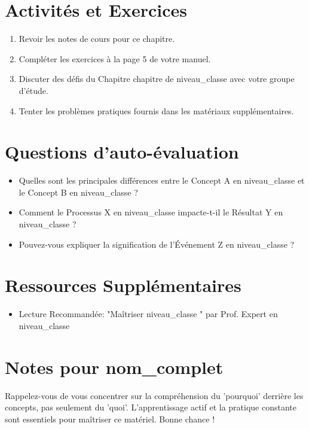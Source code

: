 \documentclass{article}
\begin{document}
\section*{Activités et Exercices}
\begin{enumerate}
    \item Revoir les notes de cours pour ce chapitre.
    \item Compléter les exercices à la page {5} de votre manuel.
    \item Discuter des défis du Chapitre {{ chapitre }} de {{ niveau_classe }} avec votre groupe d'étude.
    \item Tenter les problèmes pratiques fournis dans les matériaux supplémentaires.
\end{enumerate}

\section*{Questions d'auto-évaluation}
\begin{itemize}
    \item Quelles sont les principales différences entre le Concept A en {{ niveau_classe }} et le Concept B en {{ niveau_classe }}?
    \item Comment le Processus X en {{ niveau_classe }} impacte-t-il le Résultat Y en {{ niveau_classe }}?
    \item Pouvez-vous expliquer la signification de l'Événement Z en {{ niveau_classe }}?
\end{itemize}

\section*{Ressources Supplémentaires}
\begin{itemize}
    \item Lecture Recommandée: "Maîtriser {{ niveau_classe }}" par Prof. Expert en {{ niveau_classe }}
\end{itemize}

\section*{Notes pour {{ nom_complet }}}
Rappelez-vous de vous concentrer sur la compréhension du 'pourquoi' derrière les concepts, pas seulement du 'quoi'. L'apprentissage actif et la pratique constante sont essentiels pour maîtriser ce matériel. Bonne chance !
\end{document}
